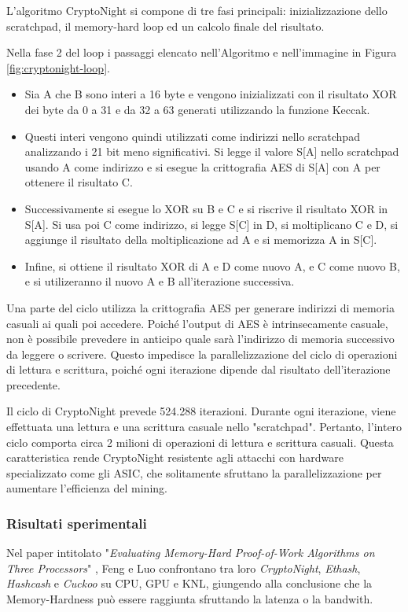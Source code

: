 L'algoritmo CryptoNight si compone di tre fasi principali:
inizializzazione dello scratchpad, il memory-hard loop ed un calcolo finale del risultato.

Nella fase 2 del loop i passaggi elencato nell'Algoritmo e nell'immagine in Figura \ref{fig:cryptonight-loop}. 
\begin{itemize}
    \item Sia A che B sono interi a 16 byte e vengono inizializzati con il risultato XOR dei byte da 0 a 31 e da 32 a 63 generati utilizzando la funzione Keccak. 
    \item Questi interi vengono quindi utilizzati come indirizzi nello scratchpad analizzando i 21 bit meno significativi. 
    Si legge il valore S[A] nello scratchpad usando A come indirizzo e si esegue la crittografia AES di S[A] con A per ottenere il risultato C. 
    \item Successivamente si esegue lo XOR su B e C e si riscrive il risultato XOR in S[A]. Si usa poi C come indirizzo, si legge S[C] in D, si moltiplicano C e D, si aggiunge il risultato della moltiplicazione ad A e si memorizza A in S[C].
    \item Infine, si ottiene il risultato XOR di A e D come nuovo A, e C come nuovo B, e si utilizeranno il nuovo A e B all'iterazione successiva. 
\end{itemize}



Una parte del ciclo utilizza la crittografia AES per generare indirizzi di memoria casuali ai quali poi accedere.
Poiché l'output di AES è intrinsecamente casuale, non è possibile prevedere in anticipo quale sarà l'indirizzo 
di memoria successivo da leggere o scrivere. Questo impedisce la parallelizzazione del ciclo di operazioni di 
lettura e scrittura, poiché ogni iterazione dipende dal risultato dell'iterazione precedente.

Il ciclo di CryptoNight prevede 524.288 iterazioni. 
Durante ogni iterazione, viene effettuata una lettura e una scrittura casuale nello "scratchpad". 
Pertanto, l'intero ciclo comporta circa 2 milioni di operazioni di lettura e scrittura casuali. 
Questa caratteristica rende CryptoNight resistente agli attacchi con hardware specializzato come gli ASIC, 
che solitamente sfruttano la parallelizzazione per aumentare l'efficienza del mining.


\subsubsection{Risultati sperimentali}
Nel paper intitolato "\textit{Evaluating Memory-Hard Proof-of-Work Algorithms on Three Processors}" \cite{asic_memory_hard}, Feng e Luo confrontano tra loro \textit{CryptoNight}, \textit{Ethash}, \textit{Hashcash} e \textit{Cuckoo} su CPU, GPU e KNL, giungendo alla conclusione che la Memory-Hardness può essere raggiunta sfruttando la latenza o la bandwith.

